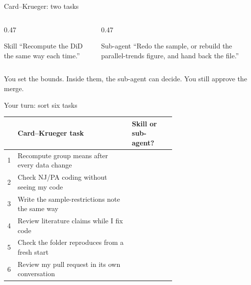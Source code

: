 \begin{frame}{Card--Krueger: two tasks}
  \begin{columns}[T,onlytextwidth]
    \begin{column}{0.47\textwidth}
      \begin{block}{Skill}
        ``Recompute the DiD the same way each time.''
      \end{block}
    \end{column}
    \begin{column}{0.47\textwidth}
      \begin{block}{Sub-agent}
        ``Redo the sample, or rebuild the parallel-trends figure, and hand back the file.''
      \end{block}
    \end{column}
  \end{columns}
  \vspace{0.7em}
  You set the bounds. Inside them, the sub-agent can decide. You still approve the merge.
\end{frame}

\begin{frame}{Your turn: sort six tasks}
  \vspace{0.2em}
  \small
  \begin{tabular}{@{}rp{0.68\linewidth}l@{}}
    \toprule
    & \textbf{Card--Krueger task} & \textbf{Skill or sub-agent?} \\
    \midrule
    1 & Recompute group means after every data change & \\
    2 & Check NJ/PA coding without seeing my code & \\
    3 & Write the sample-restrictions note the same way & \\
    4 & Review literature claims while I fix code & \\
    5 & Check the folder reproduces from a fresh start & \\
    6 & Review my pull request in its own conversation & \\
    \bottomrule
  \end{tabular}
\end{frame}
